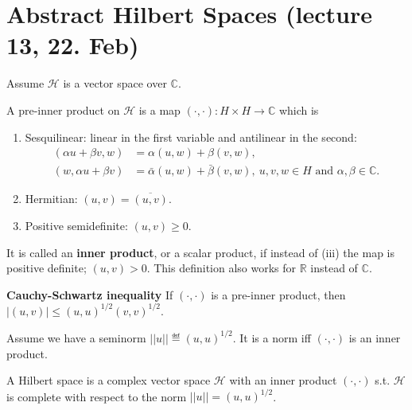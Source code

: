 \section{Abstract Hilbert Spaces (lecture 13, 22. Feb)}
Assume \(\mathcal{H}\) is a vector space over \(\mathbb{C}\).
\begin{definition}
    A pre-inner product on \(\mathcal{H}\) is a map \((\cdot,\cdot):H\times H\rightarrow\mathbb{C}\) which is
    \begin{enumerate}[label=(\roman*)]
        \item Sesquilinear: linear in the first variable and antilinear in the second:
        \begin{align*}
            (\alpha u + \beta v, w) &= \alpha(u,w) + \beta(v,w), \\
            (w, \alpha u + \beta v) &= \bar{\alpha}(u,w) + \bar{\beta}(v,w), \ u,v,w\in H \text{ and } \alpha,\beta\in\mathbb{C}.
        \end{align*}
        \item Hermitian: \((u,v)=\overline{(u,v)}\).
        \item Positive semidefinite: \((u,v)\geq 0\).
    \end{enumerate}
    It is called an \textbf{inner product}, or a scalar product, if instead of (iii) the map is positive definite; \((u,v)>0\). This definition
    also works for \(\mathbb{R}\) instead of \(\mathbb{C}\).
\end{definition}
\textbf{Cauchy-Schwartz inequality} If \((\cdot, \cdot)\) is a pre-inner product, then \(\vert (u,v)\vert \leq (u,u)^{1/2}(v,v)^{1/2}\).
\begin{corollary}
    Assume we have a seminorm \(||u||\eqdef (u,u)^{1/2}\). It is a norm iff \((\cdot,\cdot)\) is an inner product.
\end{corollary}
\begin{definition}
    A Hilbert space is a complex vector space \(\mathcal{H}\) with an inner product \((\cdot,\cdot)\) s.t. \(\mathcal{H}\) is complete with respect to the norm
    \(||u|| = (u,u)^{1/2}\).
\end{definition}

